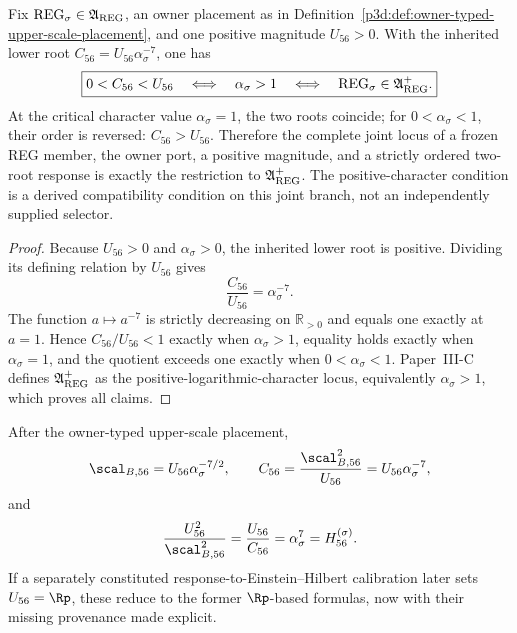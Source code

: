 \documentclass[11pt,a4paper]{article}
\begin{document}
\begin{proposition}
\label{p3d:prop:ordered-owner-joint-locus}
Fix \(\mathrm{REG}_\sigma\in\mathfrak A_{\rm REG}\), an owner placement as
in Definition~\ref{p3d:def:owner-typed-upper-scale-placement}, and one
positive magnitude \(U_{56}>0\).  With the inherited lower root
\(C_{56}=U_{56}\alpha_\sigma^{-7}\), one has
\[
 \boxed{
 0<C_{56}<U_{56}
 \quad\Longleftrightarrow\quad
 \alpha_\sigma>1
 \quad\Longleftrightarrow\quad
 \mathrm{REG}_\sigma\in\mathfrak A_{\rm REG}^{+}.}
\]
At the critical character value \(\alpha_\sigma=1\), the two roots coincide;
for \(0<\alpha_\sigma<1\), their order is reversed:
\(C_{56}>U_{56}\).  Therefore the complete joint locus of a frozen REG
member, the owner port, a positive magnitude, and a strictly ordered two-root
response is exactly the restriction to \(\mathfrak A_{\rm REG}^{+}\).  The
positive-character condition is a derived compatibility condition on this
joint branch, not an independently supplied selector.
\end{proposition}

\begin{proof}
Because \(U_{56}>0\) and \(\alpha_\sigma>0\), the inherited lower root is
positive.  Dividing its defining relation by \(U_{56}\) gives
\[
 \frac{C_{56}}{U_{56}}=\alpha_\sigma^{-7}.
\]
The function \(a\mapsto a^{-7}\) is strictly decreasing on
\(\mathbb R_{>0}\) and equals one exactly at \(a=1\).  Hence
\(C_{56}/U_{56}<1\) exactly when \(\alpha_\sigma>1\), equality holds exactly
when \(\alpha_\sigma=1\), and the quotient exceeds one exactly when
\(0<\alpha_\sigma<1\).  Paper~III-C defines
\(\mathfrak A_{\rm REG}^{+}\) as the positive-logarithmic-character locus,
equivalently \(\alpha_\sigma>1\), which proves all claims.
\end{proof}

\begin{corollary}
\label{p3:cor:hierarchy-action-scale}
After the owner-typed upper-scale placement,
\begin{equation}
\label{p3:eq:R56-def-p3}
 \scal_{B,56}=U_{56}\alpha_\sigma^{-7/2},
 \qquad
 C_{56}=\frac{\scal_{B,56}^{2}}{U_{56}}
 =U_{56}\alpha_\sigma^{-7},
\end{equation}
and
\begin{equation}
\label{p3:eq:R56-completed-hierarchy}
 \frac{U_{56}^{2}}{\scal_{B,56}^{2}}
 =\frac{U_{56}}{C_{56}}
 =\alpha_\sigma^{7}
 =H_{56}^{(\sigma)}.
\end{equation}
If a separately constituted response-to-Einstein--Hilbert calibration later
sets \(U_{56}=\Rp\), these reduce to the former \(\Rp\)-based formulas, now
with their missing provenance made explicit.
\end{corollary}
\end{document}
